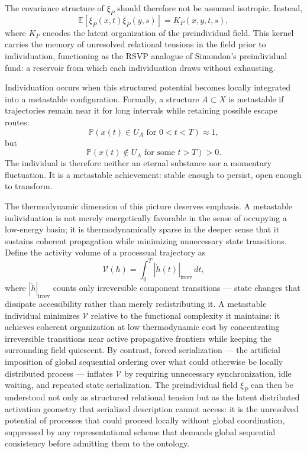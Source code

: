 \documentclass[12pt,a4paper]{article}
\begin{document}
The covariance structure of \(\xi_P\) should therefore not be assumed isotropic. Instead,
\[
\mathbb{E}[\xi_P(x,t)\xi_P(y,s)]
=
K_P(x,y,t,s),
\]
where \(K_P\) encodes the latent organization of the preindividual field. This kernel carries the memory of unresolved relational tensions in the field prior to individuation, functioning as the RSVP analogue of Simondon's preindividual fund: a reservoir from which each individuation draws without exhausting.

Individuation occurs when this structured potential becomes locally integrated into a metastable configuration. Formally, a structure \(A\subset X\) is metastable if trajectories remain near it for long intervals while retaining possible escape routes:
\[
\mathbb{P}\left(x(t)\in U_A \text{ for } 0<t<T\right)\approx 1,
\]
but
\[
\mathbb{P}\left(x(t)\notin U_A \text{ for some } t>T\right)>0.
\]
The individual is therefore neither an eternal substance nor a momentary fluctuation. It is a metastable achievement: stable enough to persist, open enough to transform.

The thermodynamic dimension of this picture deserves emphasis. A metastable individuation is not merely energetically favorable in the sense of occupying a low-energy basin; it is thermodynamically sparse in the deeper sense that it sustains coherent propagation while minimizing unnecessary state transitions. Define the activity volume of a processual trajectory as
\[
\mathcal{V}(h) = \int_0^T |\dot{h}(t)|_{\mathrm{irrev}} \, dt,
\]
where \(|\dot{h}|_{\mathrm{irrev}}\) counts only irreversible component transitions — state changes that dissipate accessibility rather than merely redistributing it. A metastable individual minimizes \(\mathcal{V}\) relative to the functional complexity it maintains: it achieves coherent organization at low thermodynamic cost by concentrating irreversible transitions near active propagative frontiers while keeping the surrounding field quiescent. By contrast, forced serialization — the artificial imposition of global sequential ordering over what could otherwise be locally distributed process — inflates \(\mathcal{V}\) by requiring unnecessary synchronization, idle waiting, and repeated state serialization. The preindividual field \(\xi_P\) can then be understood not only as structured relational tension but as the latent distributed activation geometry that serialized description cannot access: it is the unresolved potential of processes that could proceed locally without global coordination, suppressed by any representational scheme that demands global sequential consistency before admitting them to the ontology.
\end{document}
